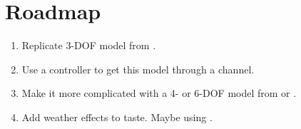 \documentclass[conference]{IEEEtran}
\begin{document}
\section{Roadmap}
\begin{enumerate}
    \item Replicate 3-DOF model from \cite{Alves2010}.
    \item Use a controller to get this model through a channel.
    \item Make it more complicated with a 4- or 6-DOF model from \cite{Buehler2018} or \cite{Setiawan2020}.
    \item Add weather effects to taste. Maybe using \cite{Paravisi2019}.
\end{enumerate}



\end{document}
